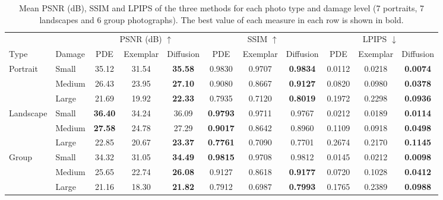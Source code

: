 \documentclass[conference]{IEEEtran}
\begin{document}
\begin{table}[!t]
  \centering
  \small
  \setlength{\tabcolsep}{4pt}
  \renewcommand{\arraystretch}{1.15}
  \begin{tabular}{llccccccccc}
    \toprule
    & & \multicolumn{3}{c}{PSNR (dB) $\uparrow$} & \multicolumn{3}{c}{SSIM $\uparrow$} & \multicolumn{3}{c}{LPIPS $\downarrow$} \\
    \cmidrule(lr){3-5} \cmidrule(lr){6-8} \cmidrule(lr){9-11}
    Type & Damage & PDE & Exemplar & Diffusion & PDE & Exemplar & Diffusion & PDE & Exemplar & Diffusion \\
    \midrule
    \multirow{3}{*}{Portrait}
      & Small  & 35.12 & 31.54 & \textbf{35.58} & 0.9830 & 0.9707 & \textbf{0.9834} & 0.0112 & 0.0218 & \textbf{0.0074} \\
      & Medium & 26.43 & 23.95 & \textbf{27.10} & 0.9080 & 0.8667 & \textbf{0.9127} & 0.0820 & 0.0980 & \textbf{0.0378} \\
      & Large  & 21.69 & 19.92 & \textbf{22.33} & 0.7935 & 0.7120 & \textbf{0.8019} & 0.1972 & 0.2298 & \textbf{0.0936} \\
    \midrule
    \multirow{3}{*}{Landscape}
      & Small  & \textbf{36.40} & 34.24 & 36.09 & \textbf{0.9793} & 0.9711 & 0.9767 & 0.0212 & 0.0189 & \textbf{0.0114} \\
      & Medium & \textbf{27.58} & 24.78 & 27.29 & \textbf{0.9017} & 0.8642 & 0.8960 & 0.1109 & 0.0918 & \textbf{0.0498} \\
      & Large  & 22.85 & 20.67 & \textbf{23.37} & \textbf{0.7761} & 0.7090 & 0.7701 & 0.2674 & 0.2170 & \textbf{0.1145} \\
    \midrule
    \multirow{3}{*}{Group}
      & Small  & 34.32 & 31.05 & \textbf{34.49} & \textbf{0.9815} & 0.9708 & 0.9812 & 0.0145 & 0.0212 & \textbf{0.0098} \\
      & Medium & 25.65 & 22.74 & \textbf{26.08} & 0.9127 & 0.8618 & \textbf{0.9177} & 0.0720 & 0.1028 & \textbf{0.0412} \\
      & Large  & 21.16 & 18.30 & \textbf{21.82} & 0.7912 & 0.6987 & \textbf{0.7993} & 0.1765 & 0.2389 & \textbf{0.0988} \\
    \bottomrule
  \end{tabular}
  \vspace{4pt}
  \caption{Mean PSNR (dB), SSIM and LPIPS of the three methods for each photo type and damage level (7 portraits, 7 landscapes and 6 group photographs). The best value of each measure in each row is shown in bold.}
  \label{tab:types}
\end{table}
\end{document}
